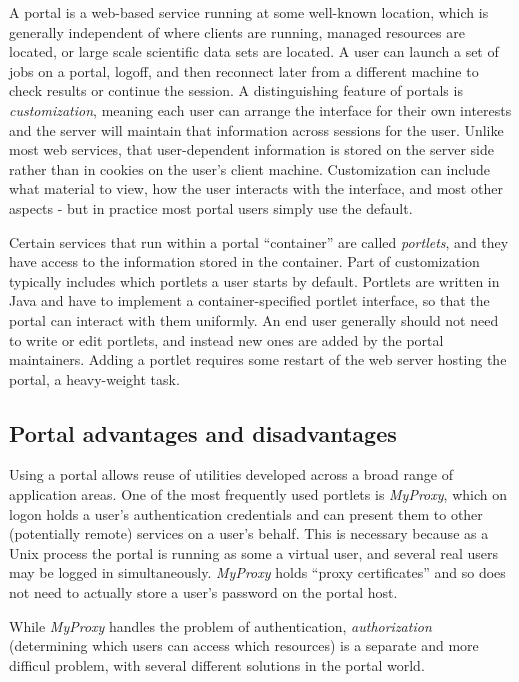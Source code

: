 A portal is a web-based service running at some well-known location, which is
generally independent of where clients are running, managed resources are
located, or large scale scientific data sets are located. A user can launch a
set of jobs on a portal, logoff, and then reconnect later from a different
machine to check results or continue the session. A distinguishing feature of
portals is {\em customization}, meaning each user can arrange the interface for
their own interests and the server will maintain that information across
sessions for the user. Unlike most web services, that user-dependent information
is stored on the server side rather than in cookies on the user's client
machine. Customization can include what material to view, how the user interacts
with the interface, and most other aspects - but in practice most portal users
simply use the default.

Certain services that run within a portal ``container'' are called {\em
portlets}, and they have access to the information stored in the container.
Part of customization typically includes which portlets a user starts by
default. Portlets are written in Java and have to implement a
container-specified portlet interface, so that the portal can interact with
them uniformly. An end user generally should not need to write or edit portlets,
and instead new ones are added by the portal maintainers. Adding a portlet
requires some restart of the web server hosting the portal, a heavy-weight
task.

\subsection{Portal advantages and disadvantages}

Using a portal allows reuse of utilities developed across a broad range of
application areas. One of the most frequently used portlets is {\em MyProxy},
\cite{myproxy} which on logon holds a user's authentication credentials and
can present them to other (potentially remote) services on a user's behalf. 
This is necessary because as a Unix process the portal is running as some a
virtual user, and several real users may be logged in simultaneously.
{\em MyProxy} holds ``proxy certificates'' and so does not need to actually
store a user's password on the portal host.  

While {\em MyProxy} handles the problem of authentication, {\em authorization}
(determining which users can access which resources) is a separate and
more difficul problem, with several different solutions in the portal world.

